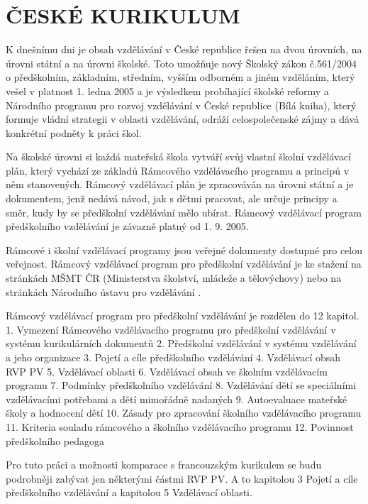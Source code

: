 \section{ČESKÉ KURIKULUM}
	K dnešnímu dni je obsah vzdělávání v České republice řešen na dvou úrovních, na úrovni státní a na úrovni školské. Toto umožňuje nový Školský zákon č.561/2004 o předškolním, základním, středním, vyšším odborném a jiném vzděláním, který vešel v platnost 1. ledna 2005 a je výsledkem probíhající školské reformy a Národního programu pro rozvoj vzdělávání v České republice (Bílá kniha), který formuje vládní strategii v oblasti vzdělávání, odráží celospolečenské zájmy a dává konkrétní podněty k práci škol.

	Na školské úrovni si každá mateřská škola vytváří svůj vlastní školní vzdělávací plán, který vychází ze základů Rámcového vzdělávacího programu a principů v něm stanovených. Rámcový vzdělávací plán je zpracováván na úrovni státní a je dokumentem, jenž nedává návod, jak s dětmi pracovat, ale určuje principy a směr, kudy by se předškolní vzdělávání mělo ubírat. Rámcový vzdělávací program předškolního vzdělávání je závazně platný od 1. 9. 2005.

	Rámcové i školní vzdělávací programy jsou veřejné dokumenty dostupné pro celou veřejnost. Rámcový vzdělávací program pro předškolní vzdělávání je ke stažení na stránkách MŠMT ČR (Ministerstva školství, mládeže a tělovýchovy) \cite{cejpek98}
	nebo na stránkách Národního ústavu pro vzdělávání \cite{cejpek98}.


	Rámcový vzdělávací program pro předškolní vzdělávání je rozdělen do 12 kapitol.
	1. Vymezení Rámcového vzdělávacího programu pro předškolní vzdělávání v systému kurikulárních dokumentů
	2. Předškolní vzdělávání v systému vzdělávání a jeho organizace
	3. Pojetí a cíle předškolního vzdělávání
	4. Vzdělávací obsah RVP PV
	5. Vzdělávací oblasti
	6. Vzdělávací obsah ve školním vzdělávacím programu 
	7. Podmínky předškolního vzdělávání
	8. Vzdělávání dětí se speciálními vzdělávacími potřebami a dětí mimořádně nadaných
	9. Autoevaluace mateřské školy a hodnocení dětí
	10. Zásady pro zpracování školního vzdělávacího programu
	11. Kriteria souladu rámcového a školního vzdělávacího programu
	12. Povinnost předškolního pedagoga

	Pro tuto práci a možnosti komparace s francouzským kurikulem se budu podrobněji zabývat jen některými částmi RVP PV. A to kapitolou 3 Pojetí a cíle předškolního vzdělávání a kapitolou 5 Vzdělávací oblasti. 

